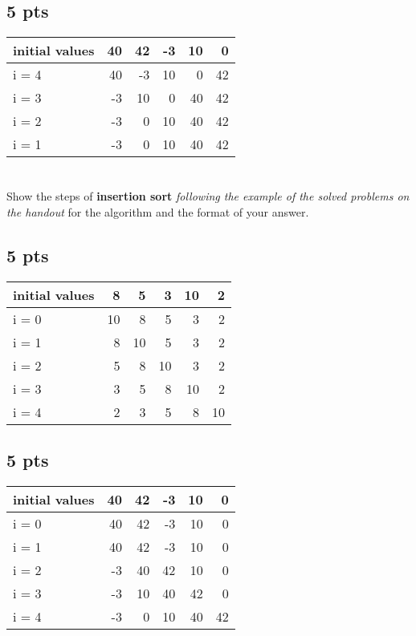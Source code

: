\documentclass[11pt]{article}
\begin{document}
\subsection{5 pts}
\label{sec:orgeb32a4b}

\begin{center}
\begin{tabular}{lrrrrr}
initial values & 40 & 42 & -3 & 10 & 0\\
\hline
i = 4 & 40 & -3 & 10 & 0 & 42\\
\hline
i = 3 & -3 & 10 & 0 & 40 & 42\\
\hline
i = 2 & -3 & 0 & 10 & 40 & 42\\
\hline
i = 1 & -3 & 0 & 10 & 40 & 42\\
\end{tabular}
\end{center}


\section{}
\label{sec:org0da6c76}
Show the steps of \textbf{insertion sort} \emph{following the example of the solved
problems on the handout} for the algorithm and the format of your answer.


\subsection{5 pts}
\label{sec:org353c073}

\begin{center}
\begin{tabular}{lrrrrr}
initial values & 8 & 5 & 3 & 10 & 2\\
\hline
i = 0 & 10 & 8 & 5 & 3 & 2\\
\hline
i = 1 & 8 & 10 & 5 & 3 & 2\\
\hline
i = 2 & 5 & 8 & 10 & 3 & 2\\
\hline
i = 3 & 3 & 5 & 8 & 10 & 2\\
\hline
i = 4 & 2 & 3 & 5 & 8 & 10\\
\end{tabular}
\end{center}

\subsection{5 pts}
\label{sec:orga2d4b75}

\begin{center}
\begin{tabular}{lrrrrr}
initial values & 40 & 42 & -3 & 10 & 0\\
\hline
i = 0 & 40 & 42 & -3 & 10 & 0\\
\hline
i = 1 & 40 & 42 & -3 & 10 & 0\\
\hline
i = 2 & -3 & 40 & 42 & 10 & 0\\
\hline
i = 3 & -3 & 10 & 40 & 42 & 0\\
\hline
i = 4 & -3 & 0 & 10 & 40 & 42\\
\end{tabular}
\end{center}
\end{document}
